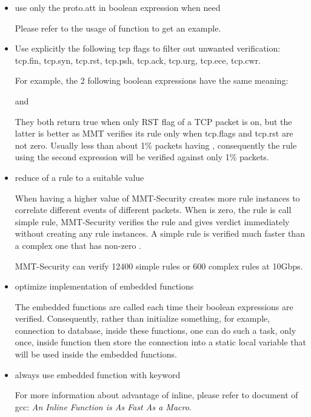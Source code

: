 \begin{itemize}
    \item 
use only the proto.att in boolean expression when need

Please refer to the usage of function  to get an example.

\item Use explicitly the following tcp flags to filter out unwanted verification: tcp.fin, tcp.syn, tcp.rst, tcp.psh, tcp.ack, tcp.urg, tcp.ece, tcp.cwr.

For example, the 2 following boolean expressions have the same meaning:

 and 

They both return true when only RST flag of a TCP packet is on, but the latter is better as MMT verifies its rule only when tcp.flags and tcp.rst are not zero. Usually less than about 1\% packets having , consequently the rule using the second expression will be verified against only 1\% packets.

\item reduce  of a rule to a suitable value

When having a higher value of  MMT-Security creates more rule instances to correlate different events of different packets. When  is zero, the rule is call simple rule, MMT-Security verifies the rule and gives verdict immediately without creating any rule instances. A simple rule is verified much faster than a complex one that has non-zero .

\recommend MMT-Security can verify 12400 simple rules or 600 complex rules at 10Gbps.

\item optimize implementation of embedded functions

The embedded functions are called each time their boolean expressions are verified. Consequently, rather than initialize something, for example, connection to database, inside these functions, one can do such a task, only once, inside function  then store the connection into a static local variable that will be used inside the embedded functions.

\item always use embedded function with  keyword

For more information about advantage of inline, please refer to document of gcc: {\em An Inline Function is As Fast As a Macro}.
\end{itemize}


